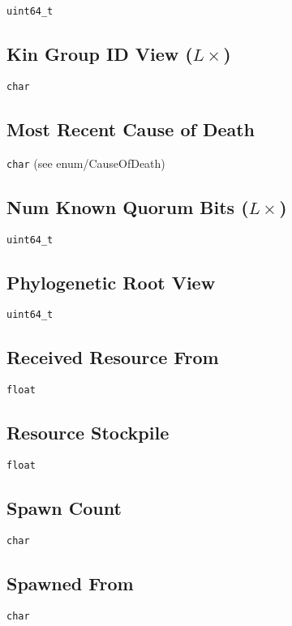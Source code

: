 \texttt{uint64\_t}

\subsection{Kin Group ID View ($L\times$)}

\texttt{char}

\subsection{Most Recent Cause of Death}

\texttt{char}
(see enum/CauseOfDeath)

\subsection{Num Known Quorum Bits ($L\times$)}

\texttt{uint64\_t}

\subsection{Phylogenetic Root View}

\texttt{uint64\_t}

\subsection{Received Resource From}

\texttt{float}

\subsection{Resource Stockpile}

\texttt{float}

\subsection{Spawn Count}

\texttt{char}

\subsection{Spawned From}

\texttt{char}